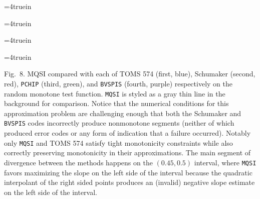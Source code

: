 \topinsert
\centerline{\epsfxsize=4truein }
\centerline{\epsfxsize=4truein }
\centerline{\epsfxsize=4truein }
\centerline{\epsfxsize=4truein }
{\narrower\noindent\rmVIII Fig.\ 8.
{\ttVIII MQSI} compared with each of TOMS 574 (first, blue), Schumaker
(second, red), {\tt PCHIP} (third, green), and {\tt BVSPIS} (fourth, purple)
respectively on the {\itVIII random monotone} test function. {\tt MQSI} is
styled as a gray thin line in the background for comparison. Notice
that the numerical conditions for this approximation problem are
challenging enough that both the Schumaker and {\tt BVSPIS} codes
incorrectly produce nonmonotone segments (neither of which produced
error codes or any form of indication that a failure
occurred). Notably only {\tt MQSI} and TOMS 574 satisfy tight monotonicity
constraints while also correctly preserving monotonicity in their
approximations. The main segment of divergence between the methods
happens on the $(0.45, 0.5)$ interval, where {\tt MQSI} favors maximizing
the slope on the left side of the interval because the quadratic
interpolant of the right sided points produces an (invalid) negative
slope estimate on the left side of the interval.
\par}
\endinsert

\endred
